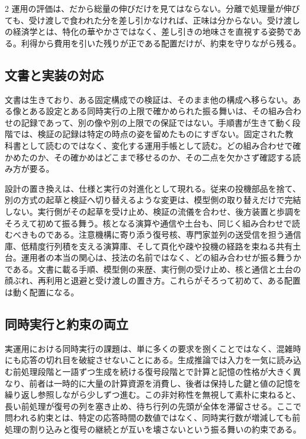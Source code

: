 \documentclass[lualatex,a4paper,10pt]{jlreq}
\begin{document}
\begin{multicols}{2}
運用の評価は、だから総量の伸びだけを見てはならない。分離で処理量が伸びても、受け渡しで食われた分を差し引かなければ、正味は分からない。受け渡しの経済学とは、特化の華やかさではなく、差し引きの地味さを直視する姿勢である。利得から費用を引いた残りが正である配置だけが、約束を守りながら残る。

\subsection{文書と実装の対応}
文書は生きており、ある固定構成での検証は、そのまま他の構成へ移らない。ある像とある設定とある同時実行の上限で確かめられた振る舞いは、その組み合わせの記録であって、別の像や別の上限での保証ではない\autocite{vllmrecipe}。手順書が生きて動く段階では、検証の記録は特定の時点の姿を留めたものにすぎない。固定された教科書として読むのではなく、変化する運用手帳として読む。どの組み合わせで確かめたのか、その確かめはどこまで移せるのか、その二点を欠かさず確認する読み方が要る。

設計の置き換えは、仕様と実行の対進化として現れる。従来の投機部品を捨て、別の方式の起草と検証へ切り替えるような変更は、模型側の取り替えだけで完結しない。実行側がその起草を受け止め、検証の流儀を合わせ、後方装置と歩調をそろえて初めて振る舞う\autocite{dspark}。核となる演算や通信や土台も、同じく組み合わせで読むべきものである。注意機構に寄り添う復号核、専門家並列の送受信を担う通信庫、低精度行列積を支える演算庫、そして頁化や疎や投機の経路を束ねる共有土台\autocite{flashmla}\autocite{flashinfer}\autocite{deepep}\autocite{deepgemm}。運用者の本当の関心は、技法の名前ではなく、どの組み合わせが振る舞うかである。文書に載る手順、模型側の来歴、実行側の受け止め、核と通信と土台の顔ぶれ、再利用と退避と受け渡しの置き方。これらがそろって初めて、ある配置は動く配置になる\autocite{vllmrecipe}\autocite{vllmv41}\autocite{vllmprefix}。

\subsection{同時実行と約束の両立}
実運用における同時実行の課題は、単に多くの要求を捌くことではなく、混雑時にも応答の切れ目を破綻させないことにある。生成推論では入力を一気に読み込む前処理段階と一語ずつ生成を続ける復号段階とで計算と記憶の性格が大きく異なり、前者は一時的に大量の計算資源を消費し、後者は保持した鍵と値の記憶を繰り返し参照しながら少しずつ進む。この非対称性を無視して素朴に束ねると、長い前処理が復号の列を塞き止め、待ち行列の先頭が全体を滞留させる。ここで問われる約束とは、特定の応答時間の数値ではなく、同時実行数が増減しても前処理の割り込みと復号の継続とが互いを壊さないという振る舞いの約束である\autocite{splitwise}\autocite{sarathi}。


\end{multicols}
\end{document}
